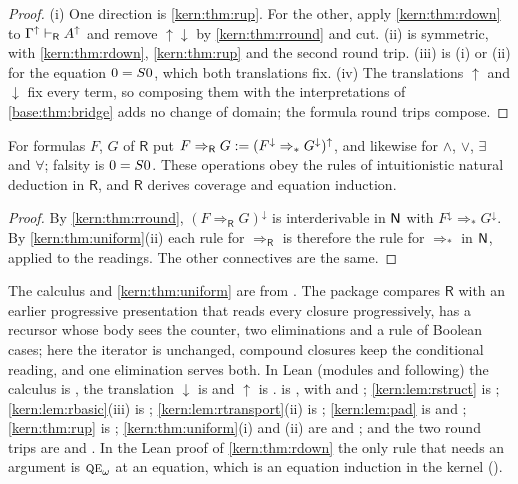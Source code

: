\begin{proof}
(i) One direction is \cref{kern:thm:rup}.  For the other, apply
\cref{kern:thm:rdown} to $\Gamma^{\uparrow}\vdash_{\mathsf{R}}A^{\uparrow}$
and remove $\uparrow\downarrow$ by \cref{kern:thm:rround} and cut.  (ii) is
symmetric, with \cref{kern:thm:rdown}, \cref{kern:thm:rup} and the second
round trip.  (iii) is (i) or (ii) for the equation $0=S 0$, which both
translations fix.  (iv) The translations $\uparrow$ and $\downarrow$ fix
every term, so composing them with the interpretations of
\cref{base:thm:bridge} adds no change of domain; the formula round trips
compose.
\end{proof}

\begin{corollary}
\label{kern:cor:rlogic}
For formulas $F$, $G$ of $\mathsf{R}$ put
$F\Rightarrow_{\mathsf{R}}G\mathrel{:=}
(F^{\downarrow}\Rightarrow_* G^{\downarrow})^{\uparrow}$, and likewise for
$\wedge$, $\vee$, $\exists$ and $\forall$; falsity is $0=S 0$.  These
operations obey the rules of intuitionistic natural deduction in
$\mathsf{R}$, and $\mathsf{R}$ derives coverage and equation induction.
\end{corollary}

\begin{proof}
By \cref{kern:thm:rround}, $(F\Rightarrow_{\mathsf{R}}G)^{\downarrow}$ is
interderivable in $\mathsf{N}$ with $F^{\downarrow}\Rightarrow_* G^{\downarrow}$.
By \cref{kern:thm:uniform}(ii) each rule for $\Rightarrow_{\mathsf{R}}$ is
therefore the rule for $\Rightarrow_*$ in $\mathsf{N}$, applied to the readings.
The other connectives are the same.
\end{proof}

\begin{remark}
\label{kern:rem:uniform-sources}
The calculus and \cref{kern:thm:uniform} are from .
The package compares $\mathsf{R}$ with an earlier progressive presentation
that reads every closure progressively, has a recursor whose body sees the
counter, two eliminations and a rule of Boolean cases; here the iterator is
unchanged, compound closures keep the conditional reading, and one
elimination serves both.  In Lean (modules  and
following) the calculus is , the translation $\downarrow$ is
 and $\uparrow$ is .   is
, with  and
; \cref{kern:lem:rstruct} is ;
\cref{kern:lem:rbasic}(iii) is ;
\cref{kern:lem:rtransport}(ii) is ; \cref{kern:lem:pad}
is  and ; \cref{kern:thm:rup} is
; \cref{kern:thm:uniform}(i) and (ii) are
 and ; and the two round trips are
 and .  In the Lean proof of
\cref{kern:thm:rdown} the only rule that needs an argument is
$\rulename{QE}_{\omega}$ at an equation, which is an equation induction in
the kernel ().
\end{remark}

